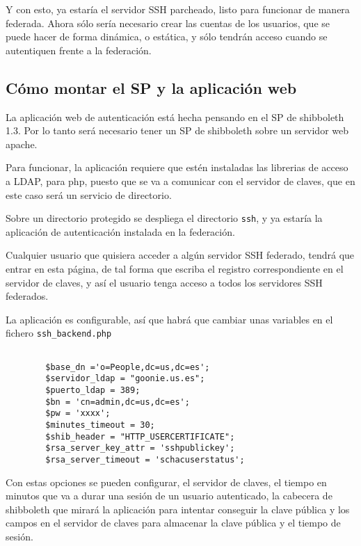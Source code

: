         Y con esto, ya estaría el servidor SSH parcheado, listo para
        funcionar de manera federada. Ahora sólo sería necesario crear
        las cuentas de los usuarios, que se puede hacer de forma
        dinámica, o estática, y sólo tendrán acceso cuando se
        autentiquen frente a la federación.

        \subsection{Cómo montar el SP y la aplicación web}

        La aplicación web de autenticación está hecha pensando en el
        SP de shibboleth 1.3. Por lo tanto será necesario tener un SP
        de shibboleth sobre un servidor web apache.

        Para funcionar, la aplicación requiere que estén instaladas
        las librerias de acceso a LDAP, para php, puesto que se va a
        comunicar con el servidor de claves, que en este caso será un
        servicio de directorio.
        
        Sobre un directorio protegido se despliega el directorio
        \texttt{ssh}, y ya estaría la aplicación de autenticación
        instalada en la federación.

        Cualquier usuario que quisiera acceder a algún servidor SSH
        federado, tendrá que entrar en esta página, de tal forma que
        escriba el registro correspondiente en el servidor de claves,
        y así el usuario tenga acceso a todos los servidores SSH
        federados.

        La aplicación es configurable, así que habrá que cambiar unas
        variables en el fichero \texttt{ssh\_backend.php}

        \begin{verbatim}

        $base_dn ='o=People,dc=us,dc=es';
        $servidor_ldap = "goonie.us.es";
        $puerto_ldap = 389;
        $bn = 'cn=admin,dc=us,dc=es';
        $pw = 'xxxx';
        $minutes_timeout = 30;
        $shib_header = "HTTP_USERCERTIFICATE";
        $rsa_server_key_attr = 'sshpublickey';
        $rsa_server_timeout = 'schacuserstatus';

        \end{verbatim}

        Con estas opciones se pueden configurar, el servidor de
        claves, el tiempo en minutos que va a durar una sesión de un
        usuario autenticado, la cabecera de shibboleth que mirará la
        aplicación para intentar conseguir la clave pública y los
        campos en el servidor de claves para almacenar la clave
        pública y el tiempo de sesión.

